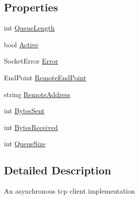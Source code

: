 \subsection*{Properties}
\begin{DoxyCompactItemize}
\item 
int \hyperlink{class_o_t_a_1_1_sockets_1_1_connection_ad91a85098c362234931489d5a439d021}{Queue\+Length}
\item 
bool \hyperlink{class_o_t_a_1_1_sockets_1_1_connection_aa8f20a081019f400ebe3bdc6512b8765}{Active}
\item 
Socket\+Error \hyperlink{class_o_t_a_1_1_sockets_1_1_connection_a4737ffa827c4702fba0a668103765f15}{Error}
\item 
End\+Point \hyperlink{class_o_t_a_1_1_sockets_1_1_connection_a20d5faf4c61da54dbfa6ccf481793e3b}{Remote\+End\+Point}
\item 
string \hyperlink{class_o_t_a_1_1_sockets_1_1_connection_ad04c77be17cdf93adbd82d15686361ad}{Remote\+Address}
\item 
int \hyperlink{class_o_t_a_1_1_sockets_1_1_connection_aff1a228fe891eb1e2d5add67cd07cc91}{Bytes\+Sent}
\item 
int \hyperlink{class_o_t_a_1_1_sockets_1_1_connection_af0ddc6a7e2b6c1cefce62c7745a99f84}{Bytes\+Received}
\item 
int \hyperlink{class_o_t_a_1_1_sockets_1_1_connection_a86342af0986b26df6cb33ed056b953b8}{Queue\+Size}
\end{DoxyCompactItemize}


\subsection{Detailed Description}
An asynchronous tcp client implementation 




